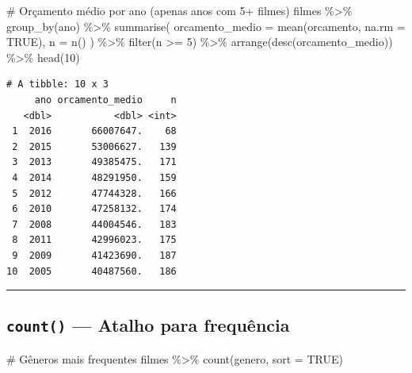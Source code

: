 \documentclass[
  letterpaper,
]{scrbook}
\newenvironment{Shaded}{\begin{snugshade}}{\end{snugshade}}
\newcommand{\AttributeTok}[1]{\textcolor[rgb]{0.40,0.45,0.13}{#1}}
\newcommand{\CommentTok}[1]{\textcolor[rgb]{0.37,0.37,0.37}{#1}}
\newcommand{\ConstantTok}[1]{\textcolor[rgb]{0.56,0.35,0.01}{#1}}
\newcommand{\DecValTok}[1]{\textcolor[rgb]{0.68,0.00,0.00}{#1}}
\newcommand{\FunctionTok}[1]{\textcolor[rgb]{0.28,0.35,0.67}{#1}}
\newcommand{\NormalTok}[1]{\textcolor[rgb]{0.00,0.23,0.31}{#1}}
\newcommand{\SpecialCharTok}[1]{\textcolor[rgb]{0.37,0.37,0.37}{#1}}
\begin{document}
\begin{Shaded}
\begin{Highlighting}[]
\CommentTok{\# Orçamento médio por ano (apenas anos com 5+ filmes)}
\NormalTok{filmes }\SpecialCharTok{\%\textgreater{}\%} 
  \FunctionTok{group\_by}\NormalTok{(ano) }\SpecialCharTok{\%\textgreater{}\%} 
  \FunctionTok{summarise}\NormalTok{(}
    \AttributeTok{orcamento\_medio =} \FunctionTok{mean}\NormalTok{(orcamento, }\AttributeTok{na.rm =} \ConstantTok{TRUE}\NormalTok{),}
    \AttributeTok{n =} \FunctionTok{n}\NormalTok{()}
\NormalTok{  ) }\SpecialCharTok{\%\textgreater{}\%} 
  \FunctionTok{filter}\NormalTok{(n }\SpecialCharTok{\textgreater{}=} \DecValTok{5}\NormalTok{) }\SpecialCharTok{\%\textgreater{}\%} 
  \FunctionTok{arrange}\NormalTok{(}\FunctionTok{desc}\NormalTok{(orcamento\_medio)) }\SpecialCharTok{\%\textgreater{}\%} 
  \FunctionTok{head}\NormalTok{(}\DecValTok{10}\NormalTok{)}
\end{Highlighting}
\end{Shaded}

\begin{verbatim}
# A tibble: 10 x 3
     ano orcamento_medio     n
   <dbl>           <dbl> <int>
 1  2016       66007647.    68
 2  2015       53006627.   139
 3  2013       49385475.   171
 4  2014       48291950.   159
 5  2012       47744328.   166
 6  2010       47258132.   174
 7  2008       44004546.   183
 8  2011       42996023.   175
 9  2009       41423690.   187
10  2005       40487560.   186
\end{verbatim}

\begin{center}\rule{0.5\linewidth}{0.5pt}\end{center}

\subsection{\texorpdfstring{\texttt{count()} --- Atalho para
frequência}{count() --- Atalho para frequência}}\label{count-atalho-para-frequuxeancia}

\begin{Shaded}
\begin{Highlighting}[]
\CommentTok{\# Gêneros mais frequentes}
\NormalTok{filmes }\SpecialCharTok{\%\textgreater{}\%} 
  \FunctionTok{count}\NormalTok{(genero, }\AttributeTok{sort =} \ConstantTok{TRUE}\NormalTok{)}
\end{Highlighting}
\end{Shaded}
\end{document}
